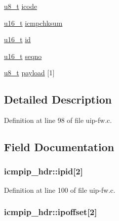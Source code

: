 \begin{DoxyCompactItemize}
\item 
\hyperlink{group__uipfw_ga4caecabca98b43919dd11be1c0d4cd8e}{u8\_\-t} \hyperlink{group__uipfw_gaf4ca6ef37e95662c8cb40bc373d52b50}{icode}
\item 
\hyperlink{group__uipfw_ga77570ac4fcab86864fa1916e55676da2}{u16\_\-t} \hyperlink{group__uipfw_ga25d4408e0b5b761b331e77a0a9b38808}{icmpchksum}
\item 
\hyperlink{group__uipfw_ga77570ac4fcab86864fa1916e55676da2}{u16\_\-t} \hyperlink{group__uipfw_ga933404ce6860a391e841f9829551df0e}{id}
\item 
\hyperlink{group__uipfw_ga77570ac4fcab86864fa1916e55676da2}{u16\_\-t} \hyperlink{group__uipfw_gafa0d3607dd6825e880db0802824fc61c}{seqno}
\item 
\hyperlink{group__uipfw_ga4caecabca98b43919dd11be1c0d4cd8e}{u8\_\-t} \hyperlink{group__uipfw_gaba8a72b0f9274932f6880c95165cb30d}{payload} \mbox{[}1\mbox{]}
\end{DoxyCompactItemize}


\subsection{Detailed Description}


Definition at line 98 of file uip-\/fw.c.



\subsection{Field Documentation}
\hypertarget{structicmpip__hdr_ac26fe184c31c51b43bd2ec2848c6e42b}{
\subsubsection[{ipid}]{ {\bf icmpip\_\-hdr::ipid}\mbox{[}2\mbox{]}}}
\label{structicmpip__hdr_ac26fe184c31c51b43bd2ec2848c6e42b}


Definition at line 100 of file uip-\/fw.c.

\hypertarget{structicmpip__hdr_abd881d3f70a42f53f92bd3dcdc35b4dd}{
\subsubsection[{ipoffset}]{ {\bf icmpip\_\-hdr::ipoffset}\mbox{[}2\mbox{]}}}
\label{structicmpip__hdr_abd881d3f70a42f53f92bd3dcdc35b4dd}


